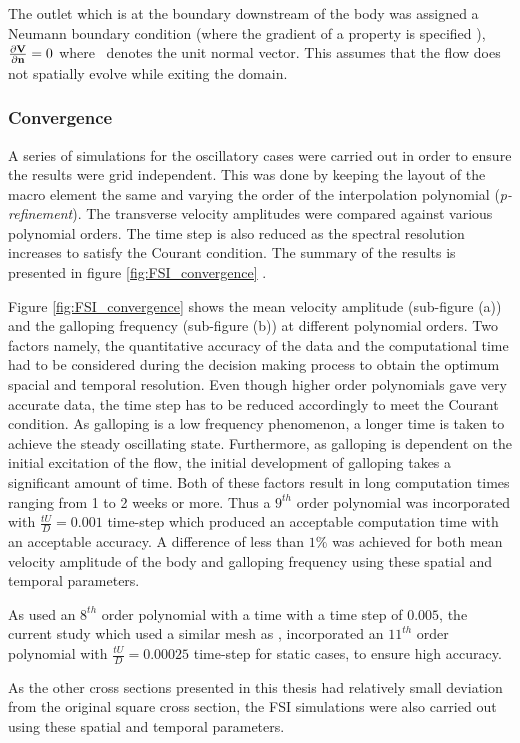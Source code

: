  The outlet which is at the boundary downstream of the body was assigned a Neumann boundary condition (where the gradient of a property is specified \citet{tu2007}), $\frac{\partial\mathbf{V}}{\partial\mathbf{n}}=0$ where \normal\ denotes the unit normal vector. This assumes that the flow does not spatially evolve while exiting the domain.

\subsubsection{Convergence}

A series of simulations for the oscillatory cases were carried out in order to ensure the results were grid independent. This was done by keeping the layout of the macro element the same and varying the order of the interpolation polynomial (\emph{p-refinement}). The transverse velocity amplitudes were compared against various polynomial orders. The time step is also reduced as the spectral resolution increases to satisfy the Courant condition. The summary of the results is presented in figure \ref{fig:FSI_convergence} .



Figure \ref{fig:FSI_convergence} shows the mean velocity amplitude (sub-figure (a)) and the galloping frequency (sub-figure (b)) at different polynomial orders. Two factors namely, the quantitative accuracy of the data and the computational time had to be considered during the decision making process to obtain the optimum spacial and temporal resolution. Even though higher order polynomials gave very accurate data, the time step has to be reduced accordingly to meet the Courant condition. As galloping is a low frequency phenomenon, a longer time is taken to achieve the steady oscillating state. Furthermore, as galloping is dependent on the initial excitation of the flow, the initial development of galloping takes a significant amount of time. Both of these factors result in long computation times ranging from 1 to 2 weeks or more. Thus a $9^{th}$ order polynomial was incorporated with $\frac{tU}{D}=0.001$ time-step which produced an acceptable computation time with an acceptable accuracy. A difference of less than $1\%$ was achieved for both mean velocity amplitude  of the body and galloping frequency using these spatial and temporal parameters.

As \citet{Leontini2013}  used an $8^{th}$ order polynomial with a time with a time step of $0.005$, the current study which used a similar mesh as \citet{Leontini2013}, incorporated an $11^{th}$ order polynomial with $\frac{tU}{D}=0.00025$ time-step for static cases, to ensure high accuracy.

As the other cross sections presented in this thesis had relatively small deviation from the original square cross section, the FSI simulations were also carried out using these spatial and temporal parameters.     















